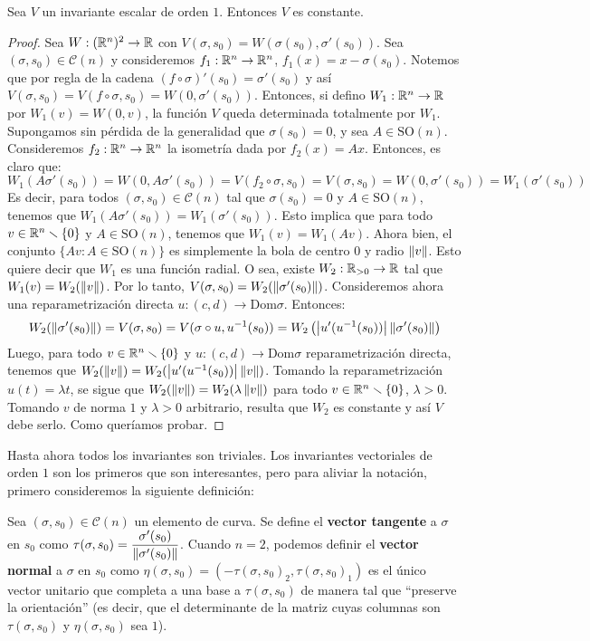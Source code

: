 \begin{prop}
Sea $V$ un invariante escalar de orden $1$. Entonces $V$ es constante.
\begin{proof}
Sea $W:(\mathbb{R}^n)^2\to\mathbb{R}$ con $V(\sigma,s_0)=W(\sigma(s_0),\sigma'(s_0))$. Sea $(\sigma,s_0)\in\mathscr{C}(n)$ y consideremos $f_1:\mathbb{R}^n\to\mathbb{R}^n$, $f_1(x)=x-\sigma(s_0)$. Notemos que por regla de la cadena $(f\circ\sigma)'(s_0) = \sigma'(s_0)$ y así $V(\sigma,s_0)=V(f\circ\sigma,s_0)=W(0,\sigma'(s_0))$. Entonces, si defino $W_1:\mathbb{R}^n\to\mathbb{R}$ por $W_1(v)=W(0,v)$, la función $V$ queda determinada totalmente por $W_1$.
Supongamos sin pérdida de la generalidad que $\sigma(s_0)=0$, y sea $A\in\mathrm{SO}(n)$. Consideremos $f_2:\mathbb{R}^n\to\mathbb{R}^n$ la isometría dada por $f_2(x)=Ax$. Entonces, es claro que: $$W_1(A\sigma'(s_0)) = W(0,A\sigma'(s_0)) = V(f_2\circ\sigma,s_0) = V(\sigma,s_0)=W(0,\sigma'(s_0))=W_1(\sigma'(s_0))$$
Es decir, para todos $(\sigma,s_0)\in\mathscr{C}(n)$ tal que $\sigma(s_0)=0$ y $A\in\mathrm{SO}(n)$, tenemos que $W_1(A\sigma'(s_0))=W_1(\sigma'(s_0))$. Esto implica que para todo $v\in\mathbb{R}^n\smallsetminus\{0\}$ y $A\in\mathrm{SO}(n)$, tenemos que $W_1(v)=W_1(Av)$. Ahora bien, el conjunto $\{Av:A\in\mathrm{SO}(n)\}$ es simplemente la bola de centro $0$ y radio $\left\| v \right\|$. Esto quiere decir que $W_1$ es una función radial. O sea, existe $W_2:\mathbb{R}_{>0}\to\mathbb{R}$ tal que $W_1(v)=W_2(\left\| v \right\|)$. Por lo tanto, $V(\sigma,s_0)=W_2(\left\| \sigma'(s_0) \right\|)$. Consideremos ahora una reparametrización directa $u:(c,d)\to\mathrm{Dom}\sigma$. Entonces: $$W_2(\left\| \sigma'(s_0) \right\|) = V(\sigma,s_0)=V(\sigma\circ u,u^{-1}(s_0)) = W_2\left(\left\lvert u'(u^{-1}(s_0)) \right\rvert\left\| \sigma'(s_0) \right\|\right)$$ Luego, para todo $v\in\mathbb{R}^n\smallsetminus\{0\}$ y $u:(c,d)\to\mathrm{Dom}\sigma$ reparametrización directa, tenemos que $W_2(\left\| v \right\|)=W_2(\left\lvert u'(u^{-1}(s_0)) \right\rvert\left\| v \right\|)$. Tomando la reparametrización $u(t)=\lambda t$, se sigue que $W_2(\left\| v \right\|)=W_2(\lambda\left\| v \right\|)$ para todo $v\in\mathbb{R}^n\smallsetminus\{0\}$, $\lambda>0$. Tomando $v$ de norma $1$ y $\lambda>0$ arbitrario, resulta que $W_2$ es constante y así $V$ debe serlo. Como queríamos probar.
\end{proof}
\end{prop}

Hasta ahora todos los invariantes son triviales. Los invariantes vectoriales de orden $1$ son los primeros que son interesantes, pero para aliviar la notación, primero consideremos la siguiente definición:

\begin{defn}
Sea $(\sigma,s_0)\in\mathscr{C}(n)$ un elemento de curva. Se define el \textbf{vector tangente} a $\sigma$ en $s_0$ como $\tau(\sigma,s_0)=\dfrac{\sigma'(s_0)}{\left\| \sigma'(s_0) \right\|}$. Cuando $n=2$, podemos definir el \textbf{vector normal} a $\sigma$ en $s_0$ como $\eta(\sigma,s_0) = (-\tau(\sigma,s_0)_2, \tau(\sigma,s_0)_1)$ es el único vector unitario que completa a una base a $\tau(\sigma,s_0)$ de manera tal que "`preserve la orientación"' (es decir, que el determinante de la matriz cuyas columnas son $\tau(\sigma,s_0)$ y $\eta(\sigma,s_0)$ sea $1$).
\end{defn}

